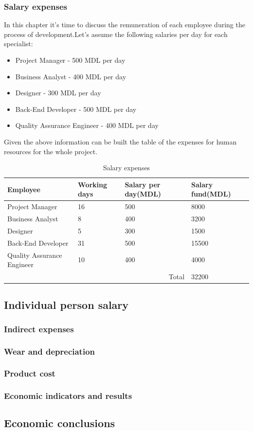 \subsubsection{Salary expenses}
In this chapter it's time to discuss the remuneration of each employee during the process of development.Let's assume the following salaries per day for each specialist:
\begin{itemize}
	\item Project Manager - 500 MDL per day
	\item Business Analyst - 400 MDL per day
	\item Designer - 300 MDL per day
	\item Back-End Developer - 500 MDL per day
	\item Quality Assurance Engineer - 400 MDL per day
\end{itemize}
Given the above information can be built the table of the expenses for human resources for the whole project.
\begin{table}[H]
	\centering
	\caption{Salary expenses}
	\label{Salary expenses}
	\begin{tabular}{|l|l|l|l|}
		\hline
		\textbf{Employee}          & \textbf{Working days} & \textbf{Salary per day(MDL)} & \textbf{Salary fund(MDL)} \\ \hline
		Project Manager            & 16                    & 500                          & 8000                      \\ \hline
		Business Analyst           & 8                     & 400                          & 3200                      \\ \hline
		Designer                   & 5                     & 300                          & 1500                      \\ \hline
		Back-End Developer         & 31                    & 500                          & 15500                     \\ \hline
		Quality Assurance Engineer & 10                    & 400                          & 4000                      \\ \hline
		\multicolumn{3}{|r|}{Total}                                                       & 32200                     \\ \hline
	\end{tabular}
\end{table}
\subsection{Individual person salary}
\subsubsection{Indirect expenses}
\subsubsection{Wear and depreciation}
\subsubsection{Product cost}
\subsubsection{Economic indicators and results}
\subsection{Economic conclusions}